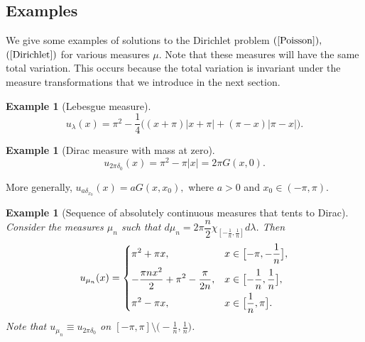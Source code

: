 \documentclass[11pt]{amsart}
\newtheorem{example}[theorem]{Example}
\numberwithin{equation}{section}
\begin{document}
\subsection{Examples} We give some examples of solutions to the Dirichlet problem \((\ref{Poisson}),\) \((\ref{Dirichlet})\) for various measures \(\mu\). Note that these measures will have the same total variation. This occurs because the total variation is invariant under the measure transformations that we introduce in the next section.
\begin{example}[Lebesgue measure]
\[u_\lambda(x)=\pi^2-\frac{1}{4}\bigl((x+\pi)|x+\pi|+(\pi-x)|\pi-x|\bigr).\]
\end{example}
\begin{example}[Dirac measure with mass at zero]\label{example dirac}
\[u_{2\pi\delta_0}(x)=\pi^2-\pi|x|=2\pi G(x,0).\]
\end{example}
More generally, \(u_{a\delta_{x_0}}(x)=aG(x,x_0),\) where \(a>0\) and \(x_0\in(-\pi,\pi).\) 
\begin{example}[Sequence of absolutely continuous measures that tents to Dirac]\textnormal{
Consider the measures \(\mu_n\) such that \(d\mu_n=2\pi\dfrac{n}{2}\mathcal{\chi}_{[-\frac{1}{n},\frac{1}{n}]}d\lambda\). Then
\[u_{\mu_n}(x)=
\begin{dcases}
\pi^2+\pi x, & x\in\bigl[-\pi,-\frac{1}{n}\bigr],\\
-\frac{\pi n x^2}{2}+\pi^2-\frac{\pi}{2n}, & x\in\bigl[-\frac{1}{n},\frac{1}{n}\bigr],\\
\pi^2-\pi x, & x\in\bigl[\frac{1}{n},\pi\bigr].
\end{dcases}\]
Note that \(u_{\mu_n}\equiv u_{2\pi\delta_0}\) on \(\displaystyle[-\pi,\pi]\setminus\bigl(-\frac{1}{n},\frac{1}{n}\bigr)\).}
\end{example}
\end{document}
